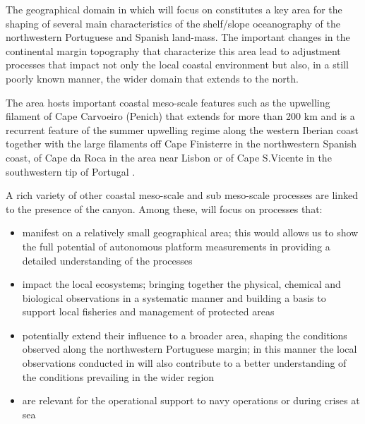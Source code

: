 The geographical domain in which \proj will focus on constitutes a key
area for the shaping of several main characteristics of the
shelf/slope oceanography of the northwestern Portuguese and Spanish
land-mass.  The important changes in the continental margin topography
that characterize this area lead to adjustment processes that impact
not only the local coastal environment but also, in a still poorly
known manner, the wider domain that extends to the north.


The area hosts important coastal meso-scale features such as the
upwelling filament of Cape Carvoeiro (Penich) that extends for more
than 200 km and is a recurrent feature of the summer upwelling regime
along the western Iberian coast together with the large filaments off
Cape Finisterre in the northwestern Spanish coast, of Cape da Roca in
the area near Lisbon or of Cape S.Vicente in the southwestern tip of
Portugal \cite{haynes93}.

A rich variety of other coastal meso-scale and sub meso-scale
processes are linked to the presence of the \naz canyon. Among these,
\proj will focus on processes that:

\begin{itemize}[noitemsep,topsep=0pt,parsep=0pt,partopsep=0pt]

\item manifest on a relatively small geographical area; this would
  allows us to show the full potential of autonomous platform
  measurements in providing a detailed understanding of the processes

\item impact the local ecosystems; bringing together the physical,
  chemical and biological observations in a systematic manner and
  building a basis to support local fisheries and management of
  protected areas

\item potentially extend their influence to a broader area, shaping
  the conditions observed along the northwestern Portuguese margin; in
  this manner the local observations conducted in \proj will also
  contribute to a better understanding of the conditions prevailing in
  the wider region

\item are relevant for the operational support to navy operations or
  during crises at sea

\end{itemize}  


